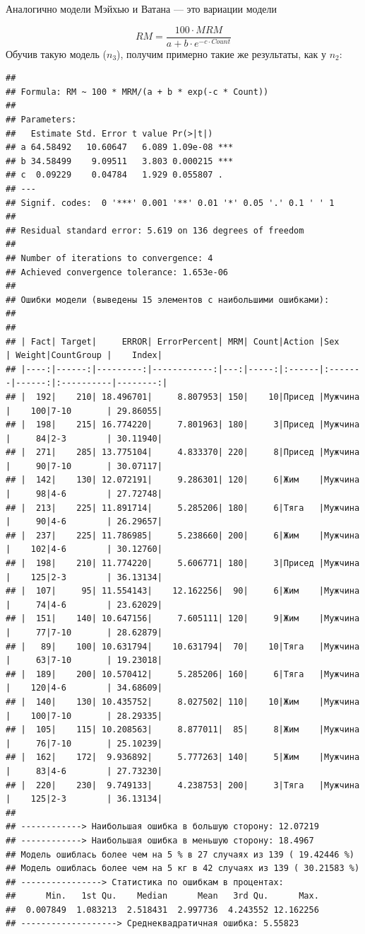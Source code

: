 \documentclass[
]{article}
\begin{document}
Аналогично модели Мэйхью и Ватана --- это вариации модели

\[RM=\frac{100 \cdot MRM}{a+b\cdot e^{-c\cdot Count}}\] Обучив такую
модель (\(n_3\)), получим примерно такие же результаты, как у \(n_2\):

\begin{verbatim}
## 
## Formula: RM ~ 100 * MRM/(a + b * exp(-c * Count))
## 
## Parameters:
##   Estimate Std. Error t value Pr(>|t|)    
## a 64.58492   10.60647   6.089 1.09e-08 ***
## b 34.58499    9.09511   3.803 0.000215 ***
## c  0.09229    0.04784   1.929 0.055807 .  
## ---
## Signif. codes:  0 '***' 0.001 '**' 0.01 '*' 0.05 '.' 0.1 ' ' 1
## 
## Residual standard error: 5.619 on 136 degrees of freedom
## 
## Number of iterations to convergence: 4 
## Achieved convergence tolerance: 1.653e-06
## 
## Ошибки модели (выведены 15 элементов с наибольшими ошибками): 
## 
## 
## | Fact| Target|     ERROR| ErrorPercent| MRM| Count|Action |Sex     | Weight|CountGroup |    Index|
## |----:|------:|---------:|------------:|---:|-----:|:------|:-------|------:|:----------|--------:|
## |  192|    210| 18.496701|     8.807953| 150|    10|Присед |Мужчина |    100|7-10       | 29.86055|
## |  198|    215| 16.774220|     7.801963| 180|     3|Присед |Мужчина |     84|2-3        | 30.11940|
## |  271|    285| 13.775104|     4.833370| 220|     8|Присед |Мужчина |     90|7-10       | 30.07117|
## |  142|    130| 12.072191|     9.286301| 120|     6|Жим    |Мужчина |     98|4-6        | 27.72748|
## |  213|    225| 11.891714|     5.285206| 180|     6|Тяга   |Мужчина |     90|4-6        | 26.29657|
## |  237|    225| 11.786985|     5.238660| 200|     6|Жим    |Мужчина |    102|4-6        | 30.12760|
## |  198|    210| 11.774220|     5.606771| 180|     3|Присед |Мужчина |    125|2-3        | 36.13134|
## |  107|     95| 11.554143|    12.162256|  90|     6|Жим    |Мужчина |     74|4-6        | 23.62029|
## |  151|    140| 10.647156|     7.605111| 120|     9|Жим    |Мужчина |     77|7-10       | 28.62879|
## |   89|    100| 10.631794|    10.631794|  70|    10|Тяга   |Мужчина |     63|7-10       | 19.23018|
## |  189|    200| 10.570412|     5.285206| 160|     6|Тяга   |Мужчина |    120|4-6        | 34.68609|
## |  140|    130| 10.435752|     8.027502| 110|    10|Жим    |Мужчина |    100|7-10       | 28.29335|
## |  105|    115| 10.208563|     8.877011|  85|     8|Жим    |Мужчина |     76|7-10       | 25.10239|
## |  162|    172|  9.936892|     5.777263| 140|     5|Жим    |Мужчина |     83|4-6        | 27.73230|
## |  220|    230|  9.749133|     4.238753| 200|     3|Тяга   |Мужчина |    125|2-3        | 36.13134|
## 
## ------------> Наибольшая ошибка в большую сторону: 12.07219 
## ------------> Наибольшая ошибка в меньшую сторону: 18.4967 
## Модель ошиблась более чем на 5 % в 27 случаях из 139 ( 19.42446 %)
## Модель ошиблась более чем на 5 кг в 42 случаях из 139 ( 30.21583 %)
## ----------------> Статистика по ошибкам в процентах:
##      Min.   1st Qu.    Median      Mean   3rd Qu.      Max. 
##  0.007849  1.083213  2.518431  2.997736  4.243552 12.162256 
## -------------------> Среднеквадратичная ошибка: 5.55823
\end{verbatim}
\end{document}
